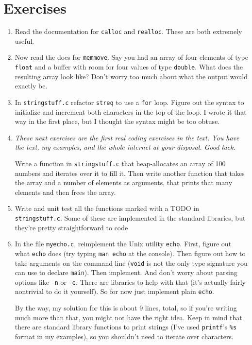 \documentclass[ebook,11pt,oneside,openany]{memoir}
\newcommand{\cf}[1]{\texttt{#1}}
\begin{document}
\section{Exercises}
\begin{enumerate}
\item Read the documentation for \texttt{calloc} and \texttt{realloc}. These are both extremely useful.

\item Now read the docs for \cf{memmove}. Say you had an array of four elements of type \cf{float} and a buffer with room for four values of type \cf{double}. What does the resulting array look like? Don't worry too much about what the output would exactly be. 

\item In \texttt{stringstuff.c} refactor \texttt{streq} to use a \texttt{for} loop. Figure out the syntax to initialize and increment both characters in the top of the loop. I wrote it that way in the first place, but I thought the syntax might be too obtuse.

\item \textit{These next exercises are the first real coding exercises in the text. You have the text, my examples, and the whole internet at your disposal. Good luck.}

Write a function in \cf{stringstuff.c} that heap-allocates an array of 100 numbers and iterates over it to fill it. Then write another function that takes the array and a number of elements as arguments, that prints that many elements and then frees the array.

\item Write and unit test all the functions marked with a TODO in \texttt{stringstuff.c}. Some of these are implemented in the standard libraries, but they're pretty straightforward to code

\item In the file \cf{myecho.c}, reimplement the Unix utility \cf{echo}. First, figure out what \cf{echo} does (try typing \cf{man echo} at the console). Then figure out how to take arguments on the command line (\cf{void} is not the only type signature you can use to declare \cf{main}). Then implement. And don't worry about parsing options like \cf{-n} or \cf{-e}. There are libraries to help with that (it's actually fairly nontrivial to do it yourself). So for now just implement plain \cf{echo}.

By the way, my solution for this is about 9 lines, total, so if you're writing much more than that, you might not have the right idea. Keep in mind that there are standard library functions to print strings (I've used \cf{printf}'s \cf{\%s} format in my examples), so you shouldn't need to iterate over characters.

\end{enumerate}
\end{document}
